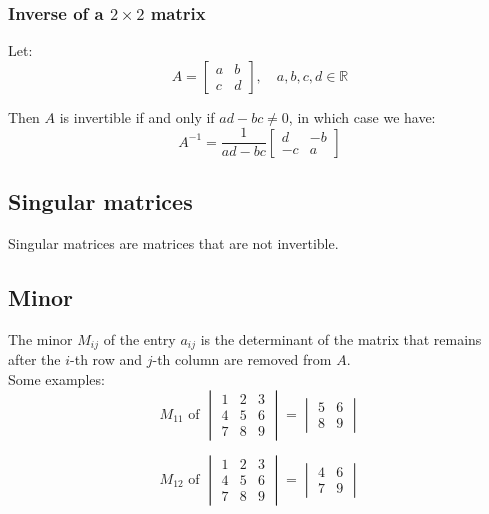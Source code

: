 \documentclass[11pt]{article}
\begin{document}
\subsubsection{Inverse of a \(2 \times 2\) matrix}
\label{sec:orgefe7ebf}
Let:
\begin{displaymath}
A = \begin{bmatrix}
a & b \\
c & d
\end{bmatrix}, \quad a, b, c, d \in \mathbb{R}
\end{displaymath}

Then \(A\) is invertible if and only if \(ad - bc \neq 0\), in which case we have:
\begin{displaymath}
A^{-1} = \frac{1}{ad - bc} \begin{bmatrix}
d & -b \\
-c & a
\end{bmatrix}
\end{displaymath}

 \newpage

\subsection{Singular matrices}
\label{sec:orga10a0d3}
Singular matrices are matrices that are not invertible.

\subsection{Minor}
\label{sec:orgc290dbf}
The minor \(M_{ij}\) of the entry \(a_{ij}\) is the determinant of the matrix that remains after the \(i\)-th row and \(j\)-th column are removed from \(A\).
\\[0pt]

Some examples:
\begin{displaymath}
M_{11} \text{ of }
\begin{vmatrix}
1 & 2 & 3 \\
4 & 5 & 6 \\
7 & 8 & 9
\end{vmatrix} = \begin{vmatrix}
5 & 6 \\
8 & 9
\end{vmatrix}
\end{displaymath}

\begin{displaymath}
M_{12} \text{ of }
\begin{vmatrix}
1 & 2 & 3 \\
4 & 5 & 6 \\
7 & 8 & 9
\end{vmatrix} = \begin{vmatrix}
4 & 6 \\
7 & 9
\end{vmatrix}
\end{displaymath}
\end{document}
